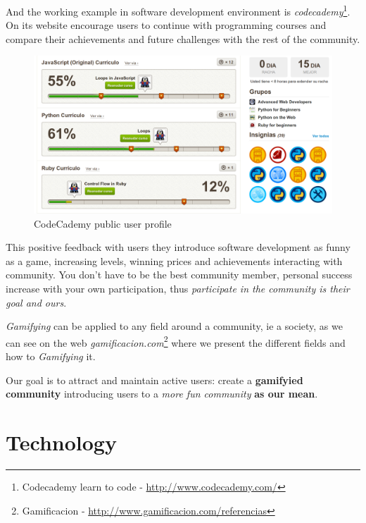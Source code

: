 \documentclass[11pt]{scrartcl}
\begin{document}
\par And the working example in software development environment is \emph{codecademy}\footnote{Codecademy learn to code - \url{http://www.codecademy.com/}}. On its website encourage users to continue with programming courses and compare their achievements and future challenges with the rest of the community.

\begin{figure}[H]
    \centering
    \includegraphics[width=1\textwidth]{codecademy-gamifying.png}
    \caption{CodeCademy public user profile}
    \label{codecademy-profile}
\end{figure}

\par This positive feedback with users they introduce software development as funny as a game, increasing levels, winning prices and achievements interacting with community. You don't have to be the best community member, personal success increase with your own participation, thus \emph{participate in the community is their goal and ours}.

\par \emph{Gamifying} can be applied to any field around a community, ie a society, as we can see on the web \emph{gamificacion.com}\footnote{Gamificacion - \url{http://www.gamificacion.com/referencias}} where we present the different fields and how to \emph{Gamifying} it.

\par Our goal is to attract and maintain active users: create a \textbf{gamifyied community} introducing users to a \emph{more fun community} \textbf{as our mean}.


\section{Technology}
\label{sec:technology}
\end{document}
